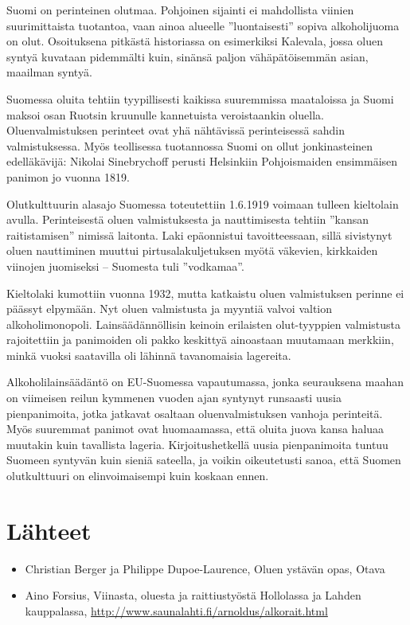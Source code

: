 \documentclass[a4paper,11pt]{report}
\begin{document}
Suomi on perinteinen olutmaa. Pohjoinen sijainti ei mahdollista viinien suurimittaista tuotantoa, vaan ainoa alueelle ''luontaisesti'' sopiva alkoholijuoma on olut. Osoituksena pitkästä historiassa on esimerkiksi Kalevala, jossa oluen syntyä kuvataan pidemmälti kuin, sinänsä paljon vähäpätöisemmän asian, maailman syntyä.

Suomessa oluita tehtiin tyypillisesti kaikissa suuremmissa maataloissa ja Suomi maksoi osan Ruotsin kruunulle kannetuista veroistaankin oluella. Oluenvalmistuksen perinteet ovat yhä nähtävissä perinteisessä sahdin valmistuksessa. Myös teollisessa tuotannossa Suomi on ollut jonkinasteinen edelläkävijä: Nikolai Sinebrychoff perusti Helsinkiin Pohjoismaiden ensimmäisen panimon jo vuonna 1819.

Olutkulttuurin alasajo Suomessa toteutettiin 1.6.1919 voimaan tulleen kieltolain avulla. Perinteisestä oluen valmistuksesta ja nauttimisesta tehtiin ''kansan raitistamisen'' nimissä laitonta. Laki epäonnistui tavoitteessaan, sillä sivistynyt oluen nauttiminen muuttui pirtusalakuljetuksen myötä väkevien, kirkkaiden viinojen juomiseksi -- Suomesta tuli ''vodkamaa''.

Kieltolaki kumottiin vuonna 1932, mutta katkaistu oluen valmistuksen perinne ei päässyt elpymään. Nyt oluen valmistusta ja myyntiä valvoi valtion alkoholimonopoli. Lainsäädännöllisin keinoin erilaisten olut-tyyppien valmistusta rajoitettiin ja panimoiden oli pakko keskittyä ainoastaan muutamaan merkkiin, minkä vuoksi saatavilla oli lähinnä tavanomaisia lagereita.

Alkoholilainsäädäntö on EU-Suomessa vapautumassa, jonka seurauksena maahan on viimeisen reilun kymmenen vuoden ajan syntynyt runsaasti uusia pienpanimoita, jotka jatkavat osaltaan oluenvalmistuksen vanhoja perinteitä. Myös suuremmat panimot ovat huomaamassa, että oluita juova kansa haluaa muutakin kuin tavallista lageria. Kirjoitushetkellä uusia pienpanimoita tuntuu Suomeen syntyvän kuin sieniä sateella, ja voikin oikeutetusti sanoa, että Suomen olutkulttuuri on elinvoimaisempi kuin koskaan ennen.


\section*{Lähteet}

\begin{itemize}
\item{Christian Berger ja Philippe Dupoe-Laurence, Oluen ystävän opas, Otava}
\item{Aino Forsius, Viinasta, oluesta ja raittiustyöstä Hollolassa ja Lahden kauppalassa, \url{http://www.saunalahti.fi/arnoldus/alkorait.html}}
\end{itemize}
\end{document}
